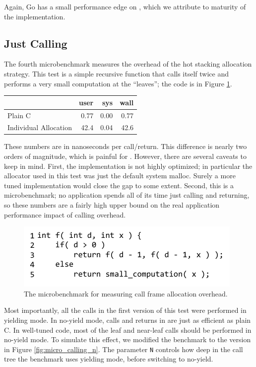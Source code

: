 \documentclass[9pt,preprint]{sigplanconf}
\begin{document}
Again, Go has a small performance edge on \charcoal{}, which we attribute to maturity of the implementation.

\subsection{Just Calling}

The fourth microbenchmark measures the overhead of the hot stacking allocation strategy.
This test is a simple recursive function that calls itself twice and performs a very small computation at the ``leaves''; the code is in Figure \ref{fig:micro_calling}.

\vspace{1em}
\begin{tabular}{|l|r|r|r|}
  \hline
   & user & sys & wall \\
  \hline
  \hline
  Plain C & 0.77 & 0.00 & 0.77 \\
  \hline
  Individual Allocation & 42.4 & 0.04 & 42.6 \\
  \hline
\end{tabular}
\vspace{1em}

These numbers are in nanoseconds per call/return.
This difference is nearly two orders of magnitude, which is painful for \charcoal{}.
However, there are several caveats to keep in mind.
First, the \charcoal{} implementation is not highly optimized; in particular the allocator used in this test was just the default system malloc.
Surely a more tuned implementation would close the gap to some extent.
Second, this is a microbenchmark; no application spends all of its time just calling and returning, so these numbers are a fairly high upper bound on the real application performance impact of calling overhead.

\begin{figure}
\includegraphics{just_calling_benchmark}
\caption{The microbenchmark for measuring call frame allocation overhead.}
\label{fig:micro_calling}
\end{figure}

Most importantly, all the calls in the first version of this test were performed in yielding mode.
In no-yield mode, calls and returns in \charcoal{} are just as efficient as plain C.
In well-tuned \charcoal{} code, most of the leaf and near-leaf calls should be performed in no-yield mode.
To simulate this effect, we modified the benchmark to the version in Figure \ref{fig:micro_calling_n}.
The parameter \texttt{N} controls how deep in the call tree the benchmark uses yielding mode, before switching to no-yield.
\end{document}
